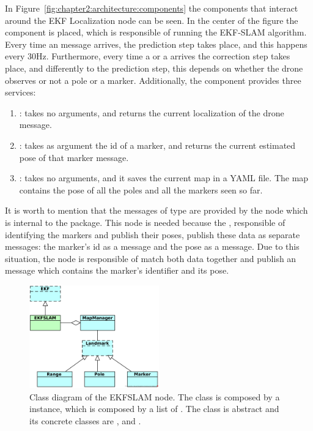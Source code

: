 In Figure~\ref{fig:chapter2:architecture:components} the components that interact around the \ac{EKF} Localization node can be seen. In the center of the figure the  component is placed, which is responsible of running the EKF-SLAM algorithm. Every time an  message arrives, the prediction step takes place, and this happens every 30Hz. Furthermore, every time a  or a  arrives the correction step takes place, and differently to the prediction step, this depends on whether the drone observes or not a pole or a marker. Additionally, the  component provides three services:
\begin{enumerate}
    \item {}: takes no arguments, and returns the current localization of the drone  message.
    \item {}: takes as argument the id of a marker, and returns the current estimated pose of that marker message.
    \item {}: takes no arguments, and it saves the current map in a YAML file. The map contains the pose of all the poles and all the markers seen so far.
\end{enumerate}

It is worth to mention that the messages of type  are provided by the  node which is internal to the  package. This node is needed because the , responsible of identifying the markers and publish their poses, publish these data as separate messages: the marker's id as a  message and the pose as a  message. Due to this situation, the  node is responsible of match both data together and publish an  message which contains the marker's identifier and its pose.\\

\begin{figure}
    \centering
    \includegraphics[width=0.5\textwidth]{Images/fig10-class_diagram}
    \caption[Class diagram of the EKFSLAM node]{Class diagram of the EKFSLAM node. The  class is composed by a  instance, which is composed by a list of . The  class is abstract and its concrete classes are ,  and .}
    \label{fig:chapter2:architecture:class}
\end{figure}

